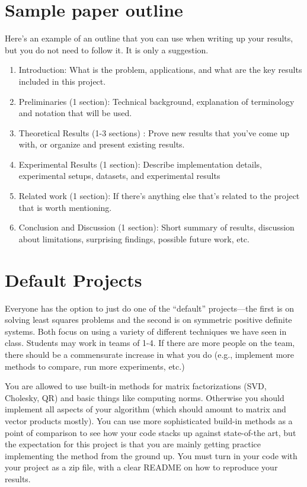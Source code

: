 \documentclass{article}
\begin{document}
	\section{Sample paper outline}
	Here's an example of an outline that you can use when writing up your results, but you do not need to follow it. It is only a suggestion.
	\begin{enumerate}
		\item Introduction: What is the problem, applications, and what are the key results included in this project.
		\item Preliminaries (1 section): Technical background, explanation of terminology and notation that will be used.
		\item Theoretical Results (1-3 sections) : Prove new results that you've come up with, or organize and present existing results.
		\item Experimental Results (1 section): Describe implementation details, experimental setups, datasets, and experimental results
		\item Related work (1 section): If there's anything else that's related to the project that is worth mentioning.
		\item Conclusion and Discussion (1 section): Short summary of results, discussion about limitations, surprising findings, possible future work, etc.
	\end{enumerate}


	\section{Default Projects}
Everyone has the option to just do one of the ``default'' projects---the first is on solving least squares problems and the second is on symmetric positive definite systems. Both focus on using a variety of different techniques we have seen in class. Students may work in teams of 1-4. If there are more people on the team, there should be a commensurate increase in what you do (e.g., implement more methods to compare, run more experiments, etc.)

You are allowed to use built-in methods for matrix factorizations (SVD, Cholesky, QR) and basic things like computing norms. Otherwise you should implement all aspects of your algorithm (which should amount to matrix and vector products mostly). You can use more sophisticated build-in methods as a point of comparison to see how your code stacks up against state-of-the art, but the expectation for this project is that you are mainly getting practice implementing the method from the ground up. You must turn in your code with your project as a zip file, with a clear README on how to reproduce your results.
\end{document}
